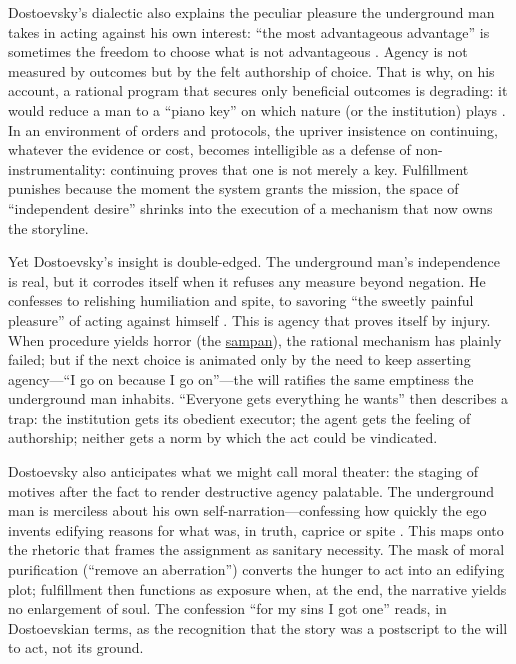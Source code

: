 Dostoevsky's dialectic also explains the peculiar pleasure the underground man takes in acting
against his own interest: ``the most advantageous advantage'' is sometimes the freedom to choose
what is not advantageous \parencite[pp.~129--131]{DostoevskyNFU1994}. Agency is not measured by
outcomes but by the felt authorship of choice. That is why, on his account, a rational program
that secures only beneficial outcomes is degrading: it would reduce a man to a ``piano key'' on
which nature (or the institution) plays \parencite[pp.~115--120]{DostoevskyNFU1994}.
In an environment of orders and protocols, the upriver insistence on continuing, whatever the
evidence or cost, becomes intelligible as a defense of non-instrumentality: continuing proves
that one is not merely a key. Fulfillment punishes because the moment the system grants the
mission, the space of ``independent desire'' shrinks into the execution of a mechanism that
now owns the storyline.

Yet Dostoevsky's insight is double-edged. The underground man's independence is real, but it
corrodes itself when it refuses any measure beyond negation. He confesses to relishing
humiliation and spite, to savoring ``the sweetly painful pleasure'' of acting against himself
\parencite[pp.~108--115]{DostoevskyNFU1994}. This is agency that proves itself by injury.
When procedure yields horror (the \hyperref[scene:sampan]{sampan}), the rational mechanism has
plainly failed; but if
the next choice is animated only by the need to keep asserting agency—``I go on because I go
on''—the will ratifies the same emptiness the underground man inhabits. ``Everyone gets
everything he wants'' then describes a trap: the institution gets its obedient executor; the
agent gets the feeling of authorship; neither gets a norm by which the act could be vindicated.

Dostoevsky also anticipates what we might call moral theater: the staging of motives after the
fact to render destructive agency palatable. The underground man is merciless about his own
self-narration—confessing how quickly the ego invents edifying reasons for what was, in truth,
caprice or spite \parencite[pp.~103--107]{DostoevskyNFU1994}. This maps onto the rhetoric that
frames the assignment as sanitary necessity. The mask of moral purification (``remove an
aberration'') converts the hunger to act into an edifying plot; fulfillment then functions as
exposure when, at the end, the narrative yields no enlargement of soul. The confession ``for my
sins I got one'' reads, in Dostoevskian terms, as the recognition that the story was a postscript
to the will to act, not its ground.

